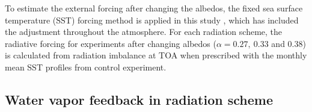 To estimate the external forcing after changing the albedos, the fixed sea surface temperature (SST) forcing method is applied in this study \citep{Hansen2005,Andrews2012cloud,Feldl2013,Kim2018}, which has included the adjustment throughout the atmosphere. For each radiation scheme, the radiative forcing for experiments after changing albedos ($\alpha=0.27, ~0.33$ and $0.38$) is calculated from radiation imbalance at TOA when prescribed with the monthly mean SST profiles from control experiment.


\subsection{Water vapor feedback in radiation scheme}
\label{sec:wv_fb_setup}

